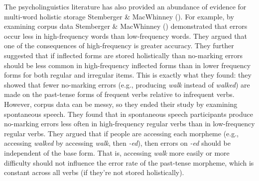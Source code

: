 \documentclass[
  12pt,
  letterpaper,
]{scrreprt}
\begin{document}
The psycholinguistics literature has also provided an abundance of
evidence for multi-word holistic storage Stemberger \& MacWhinney
(). For
example, by examining corpus data Stemberger \& MacWhinney
()
demonstrated that errors occur less in high-frequency words than
low-frequency words. They argued that one of the consequences of
high-frequency is greater accuracy. They further suggested that if
inflected forms are stored holistically than no-marking errors should be
less common in high-frequency inflected forms than in lower frequency
forms for both regular and irregular items. This is exactly what they
found: they showed that fewer no-marking errors (e.g., producing
\emph{walk} instead of \emph{walked}) are made on the past-tense forms
of frequent verbs relative to infrequent verbs. However, corpus data can
be messy, so they ended their study by examining spontaneous speech.
They found that in spontaneous speech participants produce no-marking
errors less often in high-frequency regular verbs than in low-frequency
regular verbs. They argued that if people are accessing each morpheme
(e.g., accessing \emph{walked} by accessing \emph{walk}, then
\emph{-ed}), then errors on \emph{-ed} should be independent of the base
form. That is, accessing \emph{walk} more easily or more difficulty
should not influence the error rate of the past-tense morpheme, which is
constant across all verbs (if they're not stored holistically).
\end{document}
